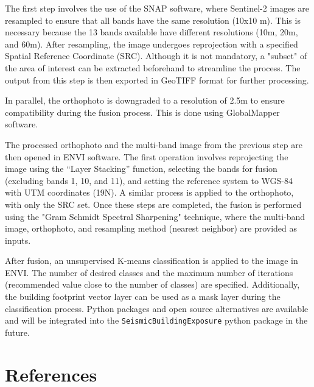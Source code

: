 \begin{refsection}
The first step involves the use of the SNAP software, where Sentinel-2 images are resampled to ensure that all bands have the same resolution (10x10 m). This is necessary because the 13 bands available have different resolutions (10m, 20m, and 60m). After resampling, the image undergoes reprojection with a specified Spatial Reference Coordinate (SRC). Although it is not mandatory, a "subset" of the area of interest can be extracted beforehand to streamline the process. The output from this step is then exported in GeoTIFF format for further processing.

In parallel, the orthophoto is downgraded to a resolution of 2.5m to ensure compatibility during the fusion process. This is done using GlobalMapper software.

The processed orthophoto and the multi-band image from the previous step are then opened in ENVI software. The first operation involves reprojecting the image using the “Layer Stacking” function, selecting the bands for fusion (excluding bands 1, 10, and 11), and setting the reference system to WGS-84 with UTM coordinates (19N). A similar process is applied to the orthophoto, with only the SRC set. Once these steps are completed, the fusion is performed using the "Gram Schmidt Spectral Sharpening" technique, where the multi-band image, orthophoto, and resampling method (nearest neighbor) are provided as inputs.

After fusion, an unsupervised K-means classification is applied to the image in ENVI. The number of desired classes and the maximum number of iterations (recommended value close to the number of classes) are specified. Additionally, the building footprint vector layer can be used as a mask layer during the classification process. Python packages and open source alternatives are available and will be integrated into the \texttt{SeismicBuildingExposure} python package in the future. 

\newpage

\renewcommand{\sectionnametext}{References}
\renewcommand{\headingtextR}{\thesection. \sectionnametext}
\section{\sectionnametext}

\printbibliography[heading=none]
\end{refsection}